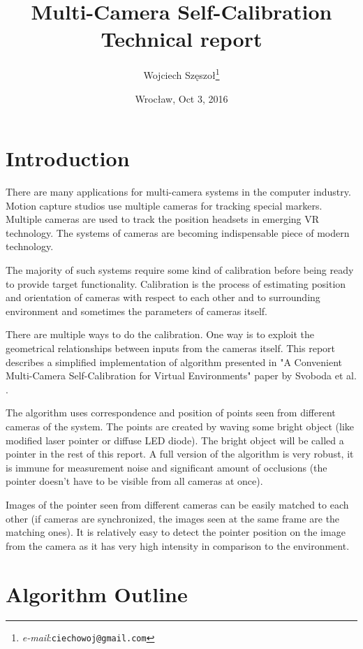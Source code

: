 \documentclass[12pt]{article}
\title{\textbf{Multi-Camera Self-Calibration}\\{\large Technical report}}
\author{Wojciech Szęszoł\thanks{\textit{e-mail}:\texttt{ciechowoj@gmail.com}}}
\date{Wrocław, Oct 3, 2016}
\begin{document}
\maketitle

\thispagestyle{empty}
\newpage

\section{Introduction}

There are many applications for multi-camera systems in the computer industry. Motion capture studios use multiple cameras for tracking special markers. Multiple
cameras are used to track the position headsets in emerging VR technology. The systems of
cameras are becoming indispensable piece of modern technology.

The majority of such systems require some kind of calibration before being
ready to provide target functionality. Calibration is the process of
estimating position and orientation of cameras with respect to each other
and to surrounding environment and sometimes the parameters of cameras itself.

There are multiple ways to do the calibration. One way is to exploit the
geometrical relationships between inputs from the cameras itself. This report
describes a simplified implementation of algorithm presented in "A Convenient
Multi-Camera  Self-Calibration for Virtual Environments" paper by Svoboda et al.
\cite{svoboda05}.

The algorithm uses correspondence and position of points seen from different
cameras of the system. The points are created by waving some bright object
(like modified laser pointer or diffuse LED diode). The bright object will be
called a pointer in the rest of this report. A full version of the algorithm is
very robust, it is immune for measurement noise and significant amount of
occlusions (the pointer doesn't have to be visible from all cameras at once).

Images of the pointer seen from different cameras can be easily matched to each
other (if cameras are synchronized, the images seen at the same frame are the
matching ones). It is relatively easy to detect the pointer position on the
image from the camera as it has very high intensity in comparison to the
environment.

\section{Algorithm Outline}
\end{document}
